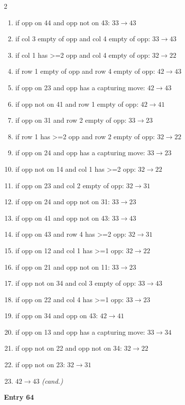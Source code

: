 \begin{multicols}{2}
\begin{tikzpicture}[scale=0.24]
\end{tikzpicture}
\nopagebreak\begin{enumerate}[topsep=1pt,itemsep=0pt,parsep=0pt,leftmargin=2.2em,label=\arabic*.]
\item if opp on 44 and opp not on 43: $33\!\to\!43$
\item if col 3 empty of opp and col 4 empty of opp: $33\!\to\!43$
\item if col 1 has >=2 opp and col 4 empty of opp: $32\!\to\!22$
\item if row 1 empty of opp and row 4 empty of opp: $42\!\to\!43$
\item if opp on 23 and opp has a capturing move: $42\!\to\!43$
\item if opp not on 41 and row 1 empty of opp: $42\!\to\!41$
\item if opp on 31 and row 2 empty of opp: $33\!\to\!23$
\item if row 1 has >=2 opp and row 2 empty of opp: $32\!\to\!22$
\item if opp on 24 and opp has a capturing move: $33\!\to\!23$
\item if opp not on 14 and col 1 has >=2 opp: $32\!\to\!22$
\item if opp on 23 and col 2 empty of opp: $32\!\to\!31$
\item if opp on 24 and opp not on 31: $33\!\to\!23$
\item if opp on 41 and opp not on 43: $33\!\to\!43$
\item if opp on 43 and row 4 has >=2 opp: $32\!\to\!31$
\item if opp on 12 and col 1 has >=1 opp: $32\!\to\!22$
\item if opp on 21 and opp not on 11: $33\!\to\!23$
\item if opp not on 34 and col 3 empty of opp: $33\!\to\!43$
\item if opp on 22 and col 4 has >=1 opp: $33\!\to\!23$
\item if opp on 34 and opp on 43: $42\!\to\!41$
\item if opp on 13 and opp has a capturing move: $33\!\to\!34$
\item if opp not on 22 and opp not on 34: $32\!\to\!22$
\item if opp not on 23: $32\!\to\!31$
\item $42\!\to\!43$ \hfill\textit{(cand.)}
\end{enumerate}\smallskip
\noindent\textbf{Entry 64} \; 
\end{multicols}
